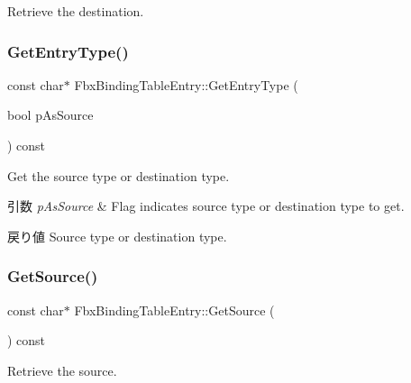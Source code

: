 Retrieve the destination. 

\mbox{\label{class_fbx_binding_table_entry_a9c116ecffcff4117ff1d3c69cf414b70}} 
\subsubsection{\texorpdfstring{Get\+Entry\+Type()}{GetEntryType()}}
{\footnotesize\ttfamily const char$\ast$ Fbx\+Binding\+Table\+Entry\+::\+Get\+Entry\+Type (\begin{DoxyParamCaption}\item[{bool}]{p\+As\+Source }\end{DoxyParamCaption}) const}

Get the source type or destination type. 
\begin{DoxyParams}{引数}
{\em p\+As\+Source} & Flag indicates source type or destination type to get. \\
\hline
\end{DoxyParams}
\begin{DoxyReturn}{戻り値}
Source type or destination type. 
\end{DoxyReturn}
\mbox{\label{class_fbx_binding_table_entry_a0c5a62a50a5fbc5408ab3ec1af16518f}} 
\subsubsection{\texorpdfstring{Get\+Source()}{GetSource()}}
{\footnotesize\ttfamily const char$\ast$ Fbx\+Binding\+Table\+Entry\+::\+Get\+Source (\begin{DoxyParamCaption}{ }\end{DoxyParamCaption}) const}



Retrieve the source. 

\mbox{\label{class_fbx_binding_table_entry_a108bed4ff64375a63667fb20eb24ec8d}} 
